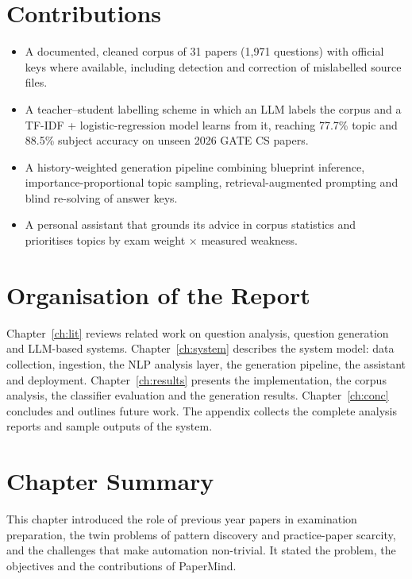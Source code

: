 \section{Contributions}
\begin{itemize}
  \item A documented, cleaned corpus of 31 papers (1,971 questions) with official keys where available, including
        detection and correction of mislabelled source files.
  \item A teacher--student labelling scheme in which an LLM labels the corpus and a TF-IDF + logistic-regression model
        learns from it, reaching 77.7\% topic and 88.5\% subject accuracy on unseen 2026 GATE CS papers.
  \item A history-weighted generation pipeline combining blueprint inference, importance-proportional topic sampling,
        retrieval-augmented prompting and blind re-solving of answer keys.
  \item A personal assistant that grounds its advice in corpus statistics and prioritises topics by
        exam weight $\times$ measured weakness.
\end{itemize}

\section{Organisation of the Report}
Chapter~\ref{ch:lit} reviews related work on question analysis, question generation and LLM-based systems.
Chapter~\ref{ch:system} describes the system model: data collection, ingestion, the NLP analysis layer, the generation
pipeline, the assistant and deployment. Chapter~\ref{ch:results} presents the implementation, the corpus analysis, the
classifier evaluation and the generation results. Chapter~\ref{ch:conc} concludes and outlines future work. The appendix
collects the complete analysis reports and sample outputs of the system.

\section{Chapter Summary}
This chapter introduced the role of previous year papers in examination preparation, the twin problems of pattern
discovery and practice-paper scarcity, and the challenges that make automation non-trivial. It stated the problem,
the objectives and the contributions of PaperMind.
